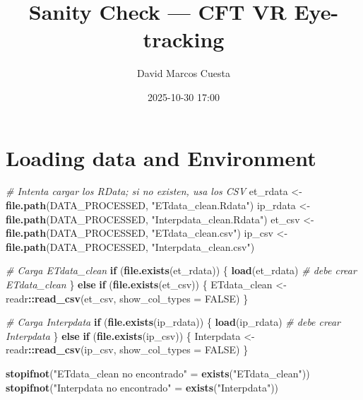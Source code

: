 \documentclass[
]{article}
\title{Sanity Check --- CFT VR Eye-tracking}
\author{David Marcos Cuesta}
\date{2025-10-30 17:00}
\newenvironment{Shaded}{\begin{snugshade}}{\end{snugshade}}
\newcommand{\AttributeTok}[1]{\textcolor[rgb]{0.13,0.29,0.53}{#1}}
\newcommand{\CommentTok}[1]{\textcolor[rgb]{0.56,0.35,0.01}{\textit{#1}}}
\newcommand{\ConstantTok}[1]{\textcolor[rgb]{0.56,0.35,0.01}{#1}}
\newcommand{\ControlFlowTok}[1]{\textcolor[rgb]{0.13,0.29,0.53}{\textbf{#1}}}
\newcommand{\FunctionTok}[1]{\textcolor[rgb]{0.13,0.29,0.53}{\textbf{#1}}}
\newcommand{\NormalTok}[1]{#1}
\newcommand{\OtherTok}[1]{\textcolor[rgb]{0.56,0.35,0.01}{#1}}
\newcommand{\SpecialCharTok}[1]{\textcolor[rgb]{0.81,0.36,0.00}{\textbf{#1}}}
\newcommand{\StringTok}[1]{\textcolor[rgb]{0.31,0.60,0.02}{#1}}
\begin{document}
\maketitle

{
\setcounter{tocdepth}{2}
\tableofcontents
}
\section{Loading data and
Environment}\label{loading-data-and-environment}

\begin{Shaded}
\begin{Highlighting}[]
\CommentTok{\# Intenta cargar los RData; si no existen, usa los CSV}
\NormalTok{et\_rdata }\OtherTok{\textless{}{-}} \FunctionTok{file.path}\NormalTok{(DATA\_PROCESSED, }\StringTok{"ETdata\_clean.Rdata"}\NormalTok{)}
\NormalTok{ip\_rdata }\OtherTok{\textless{}{-}} \FunctionTok{file.path}\NormalTok{(DATA\_PROCESSED, }\StringTok{"Interpdata\_clean.Rdata"}\NormalTok{)}
\NormalTok{et\_csv   }\OtherTok{\textless{}{-}} \FunctionTok{file.path}\NormalTok{(DATA\_PROCESSED, }\StringTok{"ETdata\_clean.csv"}\NormalTok{)}
\NormalTok{ip\_csv   }\OtherTok{\textless{}{-}} \FunctionTok{file.path}\NormalTok{(DATA\_PROCESSED, }\StringTok{"Interpdata\_clean.csv"}\NormalTok{)}

\CommentTok{\# Carga ETdata\_clean}
\ControlFlowTok{if}\NormalTok{ (}\FunctionTok{file.exists}\NormalTok{(et\_rdata)) \{}
  \FunctionTok{load}\NormalTok{(et\_rdata)  }\CommentTok{\# debe crear ETdata\_clean}
\NormalTok{\} }\ControlFlowTok{else} \ControlFlowTok{if}\NormalTok{ (}\FunctionTok{file.exists}\NormalTok{(et\_csv)) \{}
\NormalTok{  ETdata\_clean }\OtherTok{\textless{}{-}}\NormalTok{ readr}\SpecialCharTok{::}\FunctionTok{read\_csv}\NormalTok{(et\_csv, }\AttributeTok{show\_col\_types =} \ConstantTok{FALSE}\NormalTok{)}
\NormalTok{\}}

\CommentTok{\# Carga Interpdata}
\ControlFlowTok{if}\NormalTok{ (}\FunctionTok{file.exists}\NormalTok{(ip\_rdata)) \{}
  \FunctionTok{load}\NormalTok{(ip\_rdata)  }\CommentTok{\# debe crear Interpdata}
\NormalTok{\} }\ControlFlowTok{else} \ControlFlowTok{if}\NormalTok{ (}\FunctionTok{file.exists}\NormalTok{(ip\_csv)) \{}
\NormalTok{  Interpdata }\OtherTok{\textless{}{-}}\NormalTok{ readr}\SpecialCharTok{::}\FunctionTok{read\_csv}\NormalTok{(ip\_csv, }\AttributeTok{show\_col\_types =} \ConstantTok{FALSE}\NormalTok{)}
\NormalTok{\}}

\FunctionTok{stopifnot}\NormalTok{(}\StringTok{"ETdata\_clean no encontrado"} \OtherTok{=} \FunctionTok{exists}\NormalTok{(}\StringTok{"ETdata\_clean"}\NormalTok{))}
\FunctionTok{stopifnot}\NormalTok{(}\StringTok{"Interpdata no encontrado"}   \OtherTok{=} \FunctionTok{exists}\NormalTok{(}\StringTok{"Interpdata"}\NormalTok{))}


\end{Highlighting}
\end{Shaded}
\end{document}
